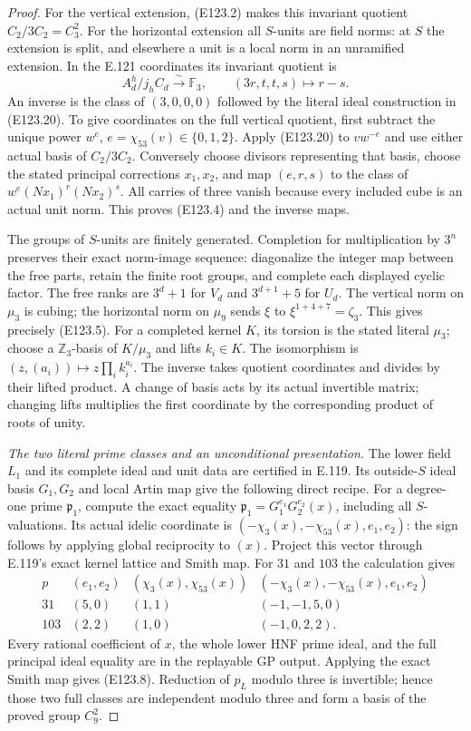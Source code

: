 \begin{proof}
For the vertical extension, (E123.2) makes this invariant quotient
$C_2/3C_2=C_3^2$. For the horizontal extension all $S$-units
are field norms: at $S$ the extension is split, and elsewhere
a unit is a local norm in an unramified extension.
In the E.121 coordinates its invariant quotient is
\[
 A_d^h/j_hC_d\xrightarrow{\sim}\mathbb F_3,\qquad
 (3r,t,t,s)\longmapsto r-s.
 \tag{E123.21}
\]
An inverse is the class of $(3,0,0,0)$ followed by the literal
ideal construction in (E123.20).
To give coordinates on the full vertical quotient, first subtract
the unique power $w^e$, $e=\chi_{53}(v)\in\{0,1,2\}$.
Apply (E123.20) to $vw^{-e}$ and use either actual basis of
$C_2/3C_2$. Conversely choose divisors representing that basis,
choose the stated principal corrections $x_1,x_2$, and map
$(e,r,s)$ to the class of $w^e(Nx_1)^r(Nx_2)^s$.
All carries of three vanish because every included cube is an
actual unit norm. This proves (E123.4) and the inverse maps.

The groups of $S$-units are finitely generated. Completion for
multiplication by $3^n$ preserves their exact norm-image sequence:
diagonalize the integer map between the free parts, retain the
finite root groups, and complete each displayed cyclic factor.
The free ranks are $3^d+1$ for $V_d$ and $3^{d+1}+5$ for $U_d$.
The vertical norm on $\mu_3$ is cubing; the horizontal norm on
$\mu_9$ sends $\xi$ to $\xi^{1+4+7}=\zeta_3$.
This gives precisely (E123.5).
For a completed kernel $K$, its torsion is the stated literal
$\mu_3$; choose a $\mathbb Z_3$-basis of $K/\mu_3$ and lifts
$k_i\in K$. The isomorphism is
$(z,(a_i))\mapsto z\prod_i k_i^{a_i}$.
The inverse takes quotient coordinates and divides by their
lifted product. A change of basis acts by its actual invertible
matrix; changing lifts multiplies the first coordinate by the
corresponding product of roots of unity.

\emph{The two literal prime classes and an unconditional presentation.}
The lower field $L_1$ and its complete ideal and unit data are
certified in E.119. Its outside-$S$ ideal basis $G_1,G_2$ and local
Artin map give the following direct recipe. For a degree-one prime
$\mathfrak p_1$, compute the exact equality
$\mathfrak p_1=G_1^{e_1}G_2^{e_2}(x)$, including all $S$-valuations.
Its actual idelic coordinate is
$(-\chi_3(x),-\chi_{53}(x),e_1,e_2)$:
the sign follows by applying global reciprocity to $(x)$.
Project this vector through E.119's exact kernel lattice and
Smith map. For $31$ and $103$ the calculation gives
\[
 \begin{array}{c|c|c|c}
 p&(e_1,e_2)&(\chi_3(x),\chi_{53}(x))&
   (-\chi_3(x),-\chi_{53}(x),e_1,e_2)\\ \hline
 31&(5,0)&(1,1)&(-1,-1,5,0)\\
 103&(2,2)&(1,0)&(-1,0,2,2).
 \end{array}
 \tag{E123.22}
\]
Every rational coefficient of $x$, the whole lower HNF prime
ideal, and the full principal ideal equality are in the
replayable GP output. Applying the exact Smith map gives
(E123.8). Reduction of $p_L$ modulo three is invertible;
hence those two full classes are independent modulo three
and form a basis of the proved group $C_9^2$.


\end{proof}
